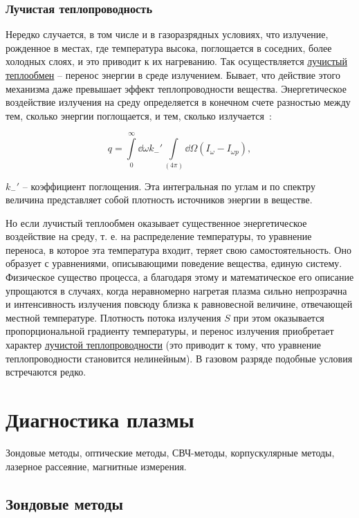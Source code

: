 \documentclass[10pt, a4paper]{article}
\let\stdsection\section
\renewcommand\section{\newpage\stdsection}
\begin{document}
\subsubsection{Лучистая теплопроводность}

Нередко случается, в том числе и в газоразрядных условиях, что излучение, рожденное в местах, где температура высока, поглощается в соседних, более холодных слоях, и это приводит к их нагреванию. Так осуществляется \uline{лучистый теплообмен} -- перенос энергии в среде излучением. Бывает, что действие этого механизма даже превышает эффект теплопроводности вещества. Энергетическое воздействие излучения на среду определяется в конечном счете разностью между тем, сколько энергии поглощается, и тем, сколько излучается~\cite{raizer}:

\begin{equation*}
	q = \int\limits_0^\infty\dd{\omega}k_{-}'\int\limits_{(4\pi)}\dd{\Omega}(I_\omega-I_{\omega p}),
\end{equation*}

$k_{-}'$ -- коэффициент поглощения. Эта интегральная по углам и по спектру величина представляет собой плотность источников энергии в веществе.

Но если лучистый теплообмен оказывает существенное энергетическое воздействие на среду, т. е. на распределение температуры, то уравнение переноса, в которое эта температура входит, теряет свою самостоятельность. Оно образует с уравнениями, описывающими поведение вещества, единую систему. Физическое существо процесса, а благодаря этому и математическое его описание упрощаются в случаях, когда неравномерно нагретая плазма сильно непрозрачна и интенсивность излучения повсюду близка к равновесной величине, отвечающей местной температуре. Плотность потока излучения $S$ при этом оказывается пропорциональной градиенту температуры, и перенос излучения приобретает характер \uline{лучистой теплопроводности} (это приводит к тому, что уравнение теплопроводности становится нелинейным). В газовом разряде подобные условия встречаются редко. 

\section{Диагностика плазмы} 

Зондовые методы, оптические методы, СВЧ-методы, корпускулярные методы, лазерное рассеяние, магнитные измерения.

\subsection{Зондовые методы}
\end{document}
